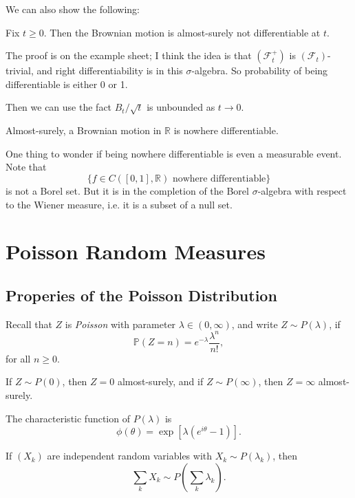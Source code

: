 \documentclass[12pt]{article}
\begin{document}
We can also show the following:
\begin{theorem}
	Fix $t \geq 0$. Then the Brownian motion is almost-surely not differentiable at $t$.
\end{theorem}

The proof is on the example sheet; I think the idea is that $(\mathcal{F}_t^+)$ is $(\mathcal{F}_t)$-trivial, and right differentiability is in this $\sigma$-algebra. So probability of being differentiable is either 0 or 1.

Then we can use the fact $B_t/\sqrt t$ is unbounded as $t \to 0$.

\begin{theorem}
	Almost-surely, a Brownian motion in $\mathbb{R}$ is nowhere differentiable.
\end{theorem}

One thing to wonder if being nowhere differentiable is even a measurable event. Note that
\[
	\{f \in C([0, 1], \mathbb{R}) \text{ nowhere differentiable}\}
\]
is not a Borel set. But it is in the completion of the Borel $\sigma$-algebra with respect to the Wiener measure, i.e. it is a subset of a null set.

\newpage

\section{Poisson Random Measures}%
\label{sec:prm}

\subsection{Properies of the Poisson Distribution}%
\label{sub:propp}

Recall that $Z$ is \emph{Poisson} with parameter $\lambda \in (0, \infty)$, and write $Z \sim P(\lambda)$, if
\[
\mathbb{P}(Z = n) = e^{-\lambda} \frac{\lambda^{n}}{n!},
\]
for all $n \geq 0$.

If $Z \sim P(0)$, then $Z = 0$ almost-surely, and if $Z \sim P(\infty)$, then $Z = \infty$ almost-surely.

The characteristic function of $P(\lambda)$ is
\[
\phi(\theta) = \exp [\lambda (e^{i\theta} - 1)].
\]
\begin{proposition}
	If $(X_k)$ are independent random variables with $X_k \sim P(\lambda_k)$, then
	\[
	\sum_k X_k \sim P \left( \sum_k \lambda_k \right).
	\]
\end{proposition}
\end{document}
